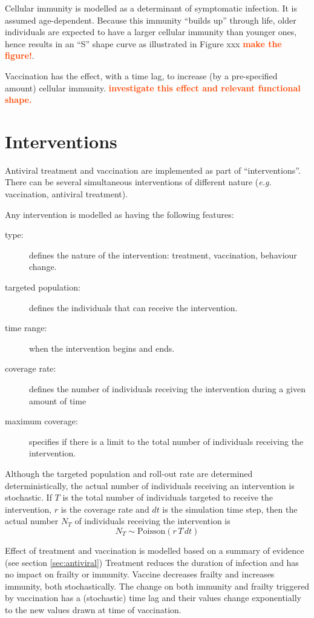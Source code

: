\documentclass[11pt, onecolumn]{article}
\newcommand{\warning}[1]{\textbf{\textcolor{OrangeRed}{#1}}}
\newcommand{\eg}{\textit{e.g.}\xspace}
\begin{document}
Cellular immunity is modelled as a determinant of symptomatic infection. It is assumed age-dependent. Because this immunity ``builds up'' through life, older individuals are expected to have a larger cellular immunity than younger ones, hence results in an ``S'' shape curve as illustrated in Figure xxx \warning{make the figure!}.

Vaccination has the effect, with a time lag, to increase (by a pre-specified amount) cellular immunity. \warning{investigate this effect and relevant functional shape.}

\section{Interventions}

Antiviral treatment and vaccination are implemented as part of ``interventions''. There can be several simultaneous interventions of different nature (\eg vaccination, antiviral treatment).

Any intervention is modelled as having the following features:
\begin{description}
\item[type: ] defines the nature of the intervention: treatment, vaccination, behaviour change.
\item[targeted population:] defines the individuals that can receive the intervention.
\item[time range:] when the intervention begins and ends.
\item[coverage rate:] defines the number of individuals receiving the intervention during a given amount of time
\item[maximum coverage:] specifies if there is a limit to the total number of individuals receiving the intervention.
\end{description}
 
Although the targeted population and roll-out rate are determined deterministically, the actual number of individuals receiving an intervention is stochastic. If $T$ is the total number of individuals targeted to receive the intervention, $r$ is the coverage rate and $dt$ is the simulation time step, then the actual number $N_T$ of individuals receiving the intervention is
\begin{equation}
N_T \sim \text{Poisson}(r\,T\,dt)
\end{equation}

Effect of treatment and vaccination is modelled based on a summary of evidence (see section \ref{sec:antiviral})
Treatment reduces the duration of infection and has no impact on frailty or immunity. Vaccine decreases frailty and increases immunity, both stochastically. The change on both immunity and frailty triggered by vaccination has a (stochastic) time lag and their values change exponentially to the new values drawn at time of vaccination.
\end{document}
